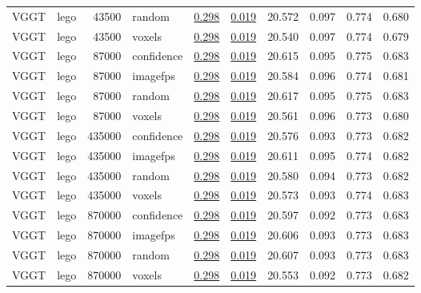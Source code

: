 \begin{table}[H]
\begin{tabular}{llrlrrrrrr}
VGGT & lego & 43500 & random & \underline{0.298} & \underline{0.019} & 20.572 & 0.097 & 0.774 & 0.680 \\
VGGT & lego & 43500 & voxels & \underline{0.298} & \underline{0.019} & 20.540 & 0.097 & 0.774 & 0.679 \\
VGGT & lego & 87000 & confidence & \underline{0.298} & \underline{0.019} & 20.615 & 0.095 & 0.775 & 0.683 \\
VGGT & lego & 87000 & imagefps & \underline{0.298} & \underline{0.019} & 20.584 & 0.096 & 0.774 & 0.681 \\
VGGT & lego & 87000 & random & \underline{0.298} & \underline{0.019} & 20.617 & 0.095 & 0.775 & 0.683 \\
VGGT & lego & 87000 & voxels & \underline{0.298} & \underline{0.019} & 20.561 & 0.096 & 0.773 & 0.680 \\
VGGT & lego & 435000 & confidence & \underline{0.298} & \underline{0.019} & 20.576 & 0.093 & 0.773 & 0.682 \\
VGGT & lego & 435000 & imagefps & \underline{0.298} & \underline{0.019} & 20.611 & 0.095 & 0.774 & 0.682 \\
VGGT & lego & 435000 & random & \underline{0.298} & \underline{0.019} & 20.580 & 0.094 & 0.773 & 0.682 \\
VGGT & lego & 435000 & voxels & \underline{0.298} & \underline{0.019} & 20.573 & 0.093 & 0.774 & 0.683 \\
VGGT & lego & 870000 & confidence & \underline{0.298} & \underline{0.019} & 20.597 & 0.092 & 0.773 & 0.683 \\
VGGT & lego & 870000 & imagefps & \underline{0.298} & \underline{0.019} & 20.606 & 0.093 & 0.773 & 0.683 \\
VGGT & lego & 870000 & random & \underline{0.298} & \underline{0.019} & 20.607 & 0.093 & 0.773 & 0.683 \\
VGGT & lego & 870000 & voxels & \underline{0.298} & \underline{0.019} & 20.553 & 0.092 & 0.773 & 0.682 \\
\bottomrule
\end{tabular}
\end{table}